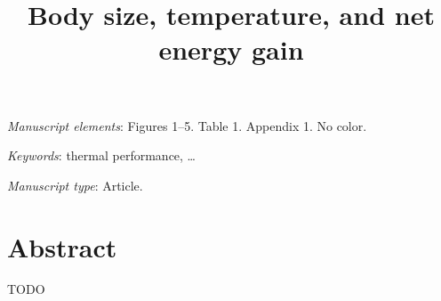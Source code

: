 \documentclass[11pt]{article}
\begin{document}


\title{Body size, temperature, and net energy gain}


\date{}

\maketitle

\bigskip

\noindent
\textit{Manuscript elements}:
Figures 1--5.
Table 1.
Appendix 1. %
No color.

\bigskip

\noindent
\textit{Keywords}:
thermal performance, \ldots

\bigskip

\noindent
\textit{Manuscript type}:
Article.

\vfill


\newpage


\linenumbers{}

\section*{Abstract}

TODO

\newpage

\end{document}
